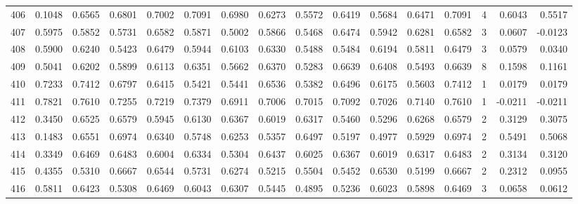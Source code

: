 \begin{tabular}{lrrrrrrrrrrrrrrr}
406 &      0.1048 &  0.6565 &  0.6801 &  0.7002 &  0.7091 &  0.6980 &  0.6273 &  0.5572 &  0.6419 &  0.5684 &   0.6471 &     0.7091 &      4 &                    0.6043 &                     0.5517 \\
407 &      0.5975 &  0.5852 &  0.5731 &  0.6582 &  0.5871 &  0.5002 &  0.5866 &  0.5468 &  0.6474 &  0.5942 &   0.6281 &     0.6582 &      3 &                    0.0607 &                    -0.0123 \\
408 &      0.5900 &  0.6240 &  0.5423 &  0.6479 &  0.5944 &  0.6103 &  0.6330 &  0.5488 &  0.5484 &  0.6194 &   0.5811 &     0.6479 &      3 &                    0.0579 &                     0.0340 \\
409 &      0.5041 &  0.6202 &  0.5899 &  0.6113 &  0.6351 &  0.5662 &  0.6370 &  0.5283 &  0.6639 &  0.6408 &   0.5493 &     0.6639 &      8 &                    0.1598 &                     0.1161 \\
410 &      0.7233 &  0.7412 &  0.6797 &  0.6415 &  0.5421 &  0.5441 &  0.6536 &  0.5382 &  0.6496 &  0.6175 &   0.5603 &     0.7412 &      1 &                    0.0179 &                     0.0179 \\
411 &      0.7821 &  0.7610 &  0.7255 &  0.7219 &  0.7379 &  0.6911 &  0.7006 &  0.7015 &  0.7092 &  0.7026 &   0.7140 &     0.7610 &      1 &                   -0.0211 &                    -0.0211 \\
412 &      0.3450 &  0.6525 &  0.6579 &  0.5945 &  0.6130 &  0.6367 &  0.6019 &  0.6317 &  0.5460 &  0.5296 &   0.6268 &     0.6579 &      2 &                    0.3129 &                     0.3075 \\
413 &      0.1483 &  0.6551 &  0.6974 &  0.6340 &  0.5748 &  0.6253 &  0.5357 &  0.6497 &  0.5197 &  0.4977 &   0.5929 &     0.6974 &      2 &                    0.5491 &                     0.5068 \\
414 &      0.3349 &  0.6469 &  0.6483 &  0.6004 &  0.6334 &  0.5304 &  0.6437 &  0.6025 &  0.6367 &  0.6019 &   0.6317 &     0.6483 &      2 &                    0.3134 &                     0.3120 \\
415 &      0.4355 &  0.5310 &  0.6667 &  0.6544 &  0.5731 &  0.6274 &  0.5215 &  0.5504 &  0.5452 &  0.6530 &   0.5199 &     0.6667 &      2 &                    0.2312 &                     0.0955 \\
416 &      0.5811 &  0.6423 &  0.5308 &  0.6469 &  0.6043 &  0.6307 &  0.5445 &  0.4895 &  0.5236 &  0.6023 &   0.5898 &     0.6469 &      3 &                    0.0658 &                     0.0612 \\

\end{tabular}
